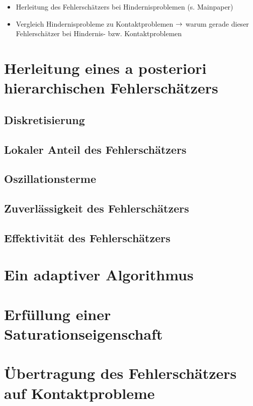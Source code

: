 
\begin{itemize}
\item Herleitung des Fehlerschätzers bei Hindernisproblemen (s. Mainpaper)
\item Vergleich Hindernisprobleme zu Kontaktproblemen $\rightarrow$ warum gerade dieser Fehlerschätzer bei Hindernis- bzw. Kontaktproblemen
\end{itemize}

\section{Herleitung eines a posteriori hierarchischen Fehlerschätzers}

\subsection{Diskretisierung}

\subsection{Lokaler Anteil des Fehlerschätzers}

\subsection{Oszillationsterme}

\subsection{Zuverlässigkeit des Fehlerschätzers}

\subsection{Effektivität des Fehlerschätzers}

\section{Ein adaptiver Algorithmus}

\section{Erfüllung einer Saturationseigenschaft}

\section{Übertragung des Fehlerschätzers auf Kontaktprobleme}

\newpage

